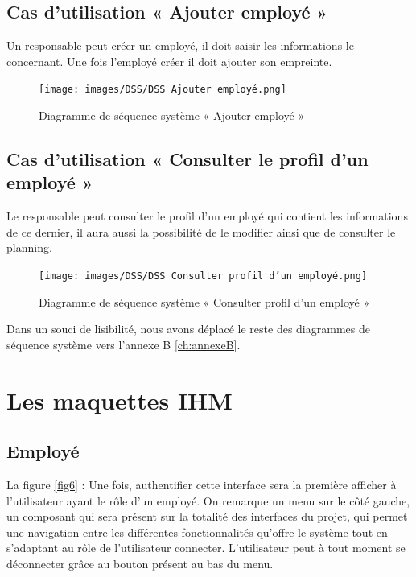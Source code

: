     \subsection{Cas d'utilisation « Ajouter employé »}
    Un responsable peut créer un employé, il doit saisir les informations le concernant. Une fois l’employé créer il doit ajouter son empreinte.   
    \clearpage
        \begin{figure}[h!]
             \centering
            \texttt{[image: images/DSS/DSS Ajouter employé.png]}
             \caption{Diagramme de séquence système « Ajouter employé »}
             \label{fig4}
        \end{figure}



    \subsection{Cas d'utilisation « Consulter le profil d'un employé »}
    Le responsable peut consulter le profil d’un employé qui contient les informations de ce dernier, il aura aussi la possibilité de le modifier ainsi que de consulter le planning.
    \clearpage
        \begin{figure}[h!]
             \centering
            \texttt{[image: images/DSS/DSS Consulter profil d'un employé.png]}
             \caption{Diagramme de séquence système « Consulter profil d'un employé »}
             \label{fig4}
        \end{figure}

    Dans un souci de lisibilité, nous avons déplacé le reste des diagrammes de séquence système vers l’annexe B \ref{ch:annexeB}.  
    
\section{Les maquettes IHM }
    
        \subsection{Employé}
        La figure \ref{fig6} : Une fois, authentifier cette interface sera la première afficher à l’utilisateur ayant le rôle d’un employé. On remarque un menu sur le côté gauche, un composant qui sera présent sur la totalité des interfaces du projet, qui permet une navigation entre les différentes fonctionnalités qu’offre le système tout en s’adaptant au rôle de l’utilisateur connecter. L’utilisateur peut à tout moment se déconnecter grâce au bouton présent au bas du menu.

